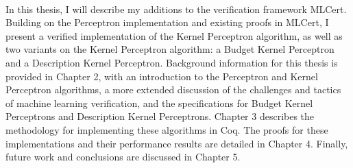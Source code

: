 \\In this thesis, I will describe my additions to the verification framework MLCert. Building on the Perceptron implementation and existing proofs in MLCert, I present a verified implementation of the Kernel Perceptron algorithm, as well as two variants on the Kernel Perceptron algorithm: a Budget Kernel Perceptron and a Description Kernel Perceptron. Background information for this thesis is provided in Chapter 2, with an introduction to the Perceptron and Kernel Perceptron algorithms, a more extended discussion of the challenges and tactics of machine learning verification, and the specifications for Budget Kernel Perceptrons and Description Kernel Perceptrons. Chapter 3 describes the methodology for implementing these algorithms in Coq. The proofs for these implementations and their performance results are detailed in Chapter 4. Finally, future work and conclusions are discussed in Chapter 5.


